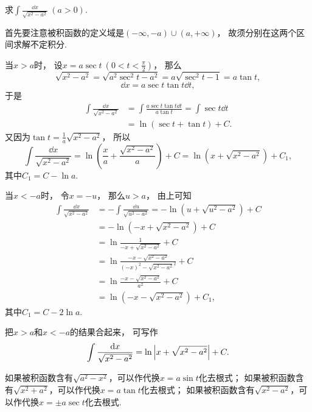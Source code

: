 \begin{example}
求\(\int \frac{\dd{x}}{\sqrt{x^2 - a^2}}\ (a>0)\).
\begin{solution}
首先要注意被积函数的定义域是\((-\infty,-a)\cup(a,+\infty)\)，
故须分别在这两个区间求解不定积分.

当\(x > a\)时，
设\(x = a \sec t\ (0 < t < \frac{\pi}{2})\)，
那么\[
	\sqrt{x^2 - a^2} = \sqrt{a^2 \sec^2 t - a^2} = a \sqrt{\sec^2 t - 1} = a \tan t,
\]\[
	\dd{x} = a \sec t \tan t \dd{t},
\]
于是\begin{align*}
	\int \frac{\dd{x}}{\sqrt{x^2 - a^2}}
	&= \int \frac{a \sec t \tan t \dd{t}}{a \tan t}
	= \int \sec t \dd{t} \\
	&= \ln(\sec t + \tan t) + C.
\end{align*}
又因为\(\tan t = \frac{1}{a} \sqrt{x^2 - a^2}\)，
所以\[
	\int \frac{\dd{x}}{\sqrt{x^2 - a^2}}
	= \ln( \frac{x}{a} + \frac{\sqrt{x^2 - a^2}}{a} ) + C
	= \ln( x + \sqrt{x^2 - a^2} ) + C_1,
\]
其中\(C_1 = C - \ln a\).

当\(x < -a\)时，
令\(x = -u\)，
那么\(u > a\)，
由上可知\begin{align*}
	\int \frac{\dd{x}}{\sqrt{x^2 - a^2}}
	&= -\int \frac{\dd{u}}{\sqrt{u^2 - a^2}}
	= -\ln(u + \sqrt{u^2 - a^2}) + C \\
	&= -\ln(-x + \sqrt{x^2 - a^2}) + C \\
	&= \ln\frac{1}{-x + \sqrt{x^2 - a^2}} + C \\
	&= \ln\frac{-x - \sqrt{x^2 - a^2}}{(-x)^2 - \sqrt{x^2 - a^2}^2} + C \\
	&= \ln\frac{-x - \sqrt{x^2 - a^2}}{a^2} + C \\
	&= \ln(-x - \sqrt{x^2 - a^2}) + C_1,
\end{align*}
其中\(C_1 = C - 2 \ln a\).

把\(x > a\)和\(x < -a\)的结果合起来，
可写作\[
	\int \frac{\dd{x}}{\sqrt{x^2 - a^2}}
	= \ln\abs{x + \sqrt{x^2 - a^2}} + C.
\]
\end{solution}
\end{example}

\begin{remark}
如果被积函数含有\(\sqrt{a^2 - x^2}\)，可以作代换\(x = a \sin t\)化去根式；
如果被积函数含有\(\sqrt{x^2 + a^2}\)，可以作代换\(x=a \tan t\)化去根式；
如果被积函数含有\(\sqrt{x^2 - a^2}\)，可以作代换\(x=\pm a \sec t\)化去根式.
\end{remark}

